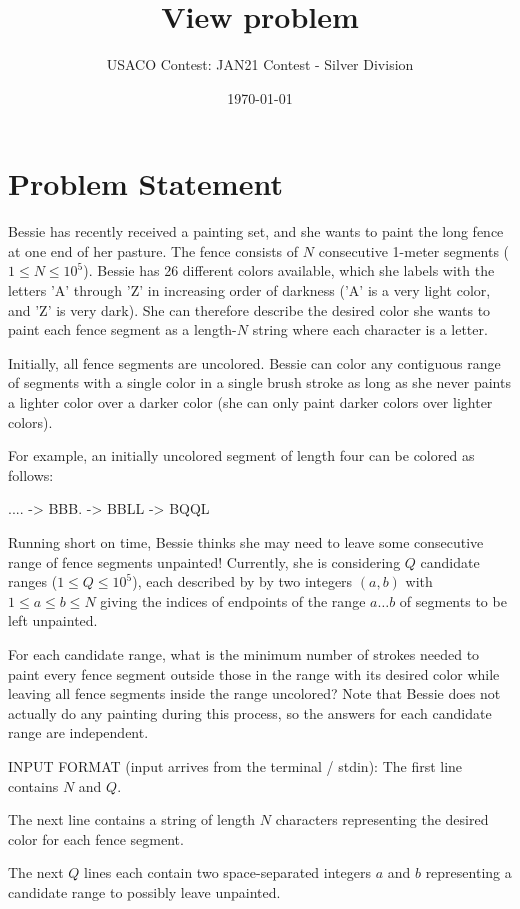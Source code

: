 \documentclass[12pt]{article}
\title{View problem}
\author{USACO Contest: JAN21 Contest - Silver Division}
\date{\today}
\begin{document}
\maketitle

\section*{Problem Statement}

Bessie has recently received a painting set, and she wants to paint the long
fence at one end of her pasture.  The fence consists of $N$ consecutive 1-meter 
segments ($1\le N\le 10^5$).  Bessie has 26 different colors available, which
she labels with the letters 'A' through 'Z' in increasing order of darkness ('A'
is a very light color, and 'Z' is very dark).  She can therefore describe the
desired color she wants to paint each fence segment as a length-$N$ string where
each character is a letter.

Initially, all fence segments are uncolored.  Bessie can color any  contiguous
range of segments with a single color in a single brush stroke as long as she
never paints a lighter color over a darker color (she can only paint darker
colors over lighter colors).  

For example, an initially uncolored segment of length four can be colored as
follows:


.... -> BBB. -> BBLL -> BQQL

Running short on time, Bessie thinks she may need to leave some consecutive
range of fence segments unpainted! Currently, she is considering $Q$  candidate
ranges ($1\le Q\le 10^5$), each described by  by two integers $(a,b)$ with
$1 \leq a \leq b \leq N$ giving the indices of  endpoints of the range
$a \ldots b$ of segments to be left unpainted.

For each candidate range, what is the minimum number of strokes needed to paint
every fence segment outside those in the range with its desired color while 
leaving all fence segments inside the range uncolored?  Note that Bessie does
not actually do any painting during this process, so the answers for each
candidate range are independent. 

INPUT FORMAT (input arrives from the terminal / stdin):
The first line contains $N$ and $Q$.

The next line contains a string of length $N$ characters representing the
desired color  for each fence segment.

The next $Q$ lines each contain two space-separated integers $a$ and $b$
representing a candidate range to possibly leave unpainted.
\end{document}

